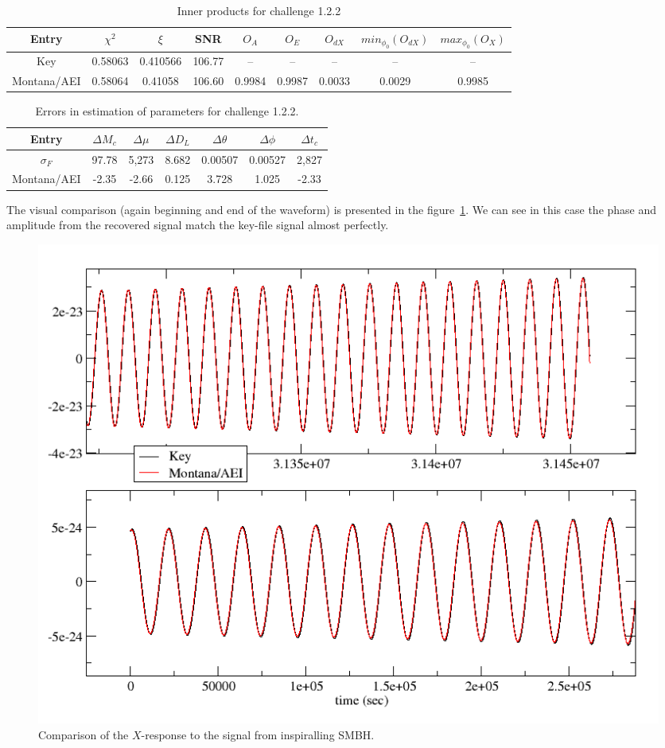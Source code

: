 \documentclass[prd,aps,amsfonts,amsmath, nofootinbib]{revtex4}
\begin{document}
\begin{table}
\caption{\label{OlapsTable1.2.2} Inner products for challenge 1.2.2}
\begin{ruledtabular}
\begin{tabular}{|c|c|c|c|c|c|c|c|c|}
Entry & $\chi^2$ & $\xi$ & SNR & $O_A$ & $O_E$ & $O_{dX}$ & $min_{\phi_0}(O_{dX})$ & $max_{\phi_0}(O_X)$\\
\hline
Key & 0.58063 & 0.410566 & 106.77 & -- & -- & -- & -- & -- \\
Montana/AEI & 0.58064 & 0.41058 &  106.60 & 0.9984 & 0.9987 & 0.0033 & 0.0029 & 0.9985 \\
\hline
\end{tabular}
\end{ruledtabular}
\end{table}

\begin{table}
\caption{\label{Errors1.2.2} Errors in estimation of parameters for challenge 1.2.2. }
\begin{ruledtabular}
\begin{tabular}{|c|c|c|c|c|c|c|}
Entry & $\Delta M_c$ & $\Delta \mu $ & $\Delta D_{L}$ & $\Delta \theta $ & $\Delta \phi $ & $\Delta t_c $ \\ 
\hline
$\sigma_{F}$ & 97.78 & 5,273 & 8.682 & 0.00507 & 0.00527 & 2,827\\
Montana/AEI & -2.35 & -2.66 & 0.125  & 3.728 & 1.025 & -2.33  \\
\hline
\end{tabular}
\end{ruledtabular}
\end{table}


The visual comparison (again beginning and end of the waveform) is presented in the figure~\ref{fig1.2.2}.  We can see in this case the phase and amplitude from the recovered signal match the key-file signal almost perfectly.

\begin{figure}[ht]
\includegraphics[height=0.6\textheight,
keepaspectratio=true,angle=0]{Eval122.png}
\caption{Comparison of the $X$-response to the signal from inspiralling SMBH. }
\label{fig1.2.2}
\end{figure}
\end{document}

